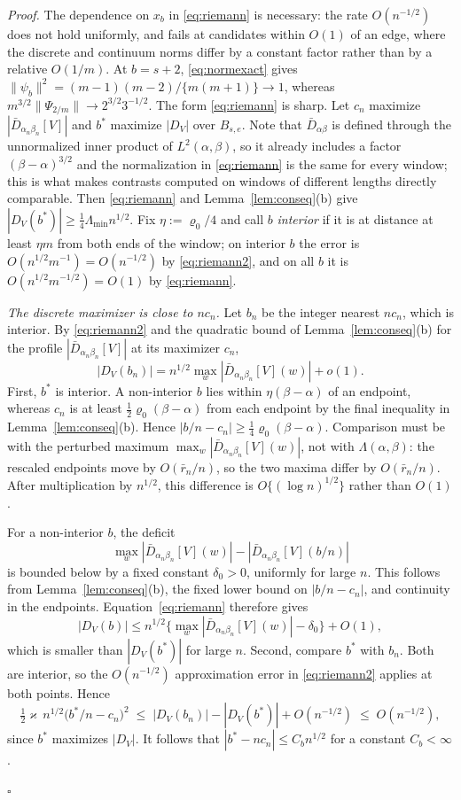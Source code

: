 \documentclass[12pt, a4paper]{article}
\newcommand{\qed}{\hfill$\square$}
\newenvironment{proof}[1][Proof]{\par\noindent\textit{#1.}\space}{\qed\par\medskip}
\begin{document}
\begin{proof}
The dependence on $x_b$ in \eqref{eq:riemann} is necessary: the rate $O(n^{-1/2})$ does not hold uniformly, and fails at candidates within $O(1)$ of an edge, where the discrete and continuum norms differ by a constant factor rather than by a relative $O(1/m)$. At $b = s+2$, \eqref{eq:normexact} gives $\|\psi_b\|^2 = (m-1)(m-2)/\{m(m+1)\} \to 1$, whereas $m^{3/2}\|\Psi_{2/m}\| \to 2^{3/2}3^{-1/2}$. The form \eqref{eq:riemann} is sharp.
Let $c_n$ maximize $|\bar D_{\alpha_n\beta_n}[V]|$ and $b^*$ maximize
$|D_V|$ over $B_{s,e}$. Note that $\bar D_{\alpha\beta}$ is defined through the unnormalized inner product of $L^2(\alpha,\beta)$, so it already includes a factor $(\beta-\alpha)^{3/2}$ and the normalization in \eqref{eq:riemann} is the same for every window; this is what makes contrasts computed on windows of different lengths directly comparable. Then \eqref{eq:riemann} and Lemma~\ref{lem:conseq}(b) give $|D_V(b^*)| \ge \tfrac14\Lambda_{\min}n^{1/2}$. Fix $\eta := \varrho_0/4$ and call $b$ \emph{interior} if it is at distance at least $\eta m$ from both ends of the window; on interior $b$ the error is $O(n^{1/2}m^{-1}) = O(n^{-1/2})$ by \eqref{eq:riemann2}, and on all $b$ it is $O(n^{1/2}m^{-1/2}) = O(1)$ by \eqref{eq:riemann}.

\emph{The discrete maximizer is close to $nc_n$.} Let $b_n$ be the integer
nearest $nc_n$, which is interior. By \eqref{eq:riemann2} and the quadratic
bound of Lemma~\ref{lem:conseq}(b) for the profile
$|\bar D_{\alpha_n\beta_n}[V]|$ at its maximizer $c_n$,
\[
|D_V(b_n)|=n^{1/2}\max_w|\bar D_{\alpha_n\beta_n}[V](w)|+o(1).
\]
First, $b^*$ is interior. A non-interior $b$ lies within
$\eta(\beta-\alpha)$ of an endpoint, whereas $c_n$ is at least
$\tfrac12\varrho_0(\beta-\alpha)$ from each endpoint by the final inequality
in Lemma~\ref{lem:conseq}(b). Hence
$|b/n-c_n|\ge\tfrac14\varrho_0(\beta-\alpha)$. Comparison must be with the
perturbed maximum $\max_w|\bar D_{\alpha_n\beta_n}[V](w)|$, not with
$\Lambda(\alpha,\beta)$: the rescaled endpoints move by $O(\bar r_n/n)$, so
the two maxima differ by $O(\bar r_n/n)$. After multiplication by $n^{1/2}$,
this difference is $O\{(\log n)^{1/2}\}$ rather than $O(1)$.

For a non-interior $b$, the deficit
\[
\max_w|\bar D_{\alpha_n\beta_n}[V](w)|
-|\bar D_{\alpha_n\beta_n}[V](b/n)|
\]
is bounded below by a fixed constant $\delta_0>0$, uniformly for large $n$.
This follows from Lemma~\ref{lem:conseq}(b), the fixed lower bound on
$|b/n-c_n|$, and continuity in the endpoints. Equation~\eqref{eq:riemann}
therefore gives
\[
|D_V(b)|\le n^{1/2}
\{\max_w|\bar D_{\alpha_n\beta_n}[V](w)|-\delta_0\}+O(1),
\]
which is smaller than $|D_V(b^*)|$ for large $n$. Second, compare $b^*$ with
$b_n$. Both are interior, so the $O(n^{-1/2})$ approximation error in
\eqref{eq:riemann2} applies at both points. Hence
\[
\tfrac12\varkappa\, n^{1/2}\big( b^*/n - c_n \big)^2 \;\le\; |D_V(b_n)| - |D_V(b^*)| + O(n^{-1/2}) \;\le\; O(n^{-1/2}),
\]
since $b^*$ maximizes $|D_V|$. It follows that
$|b^*-nc_n|\le C_b n^{1/2}$ for a constant $C_b<\infty$.


\end{proof}
\end{document}
